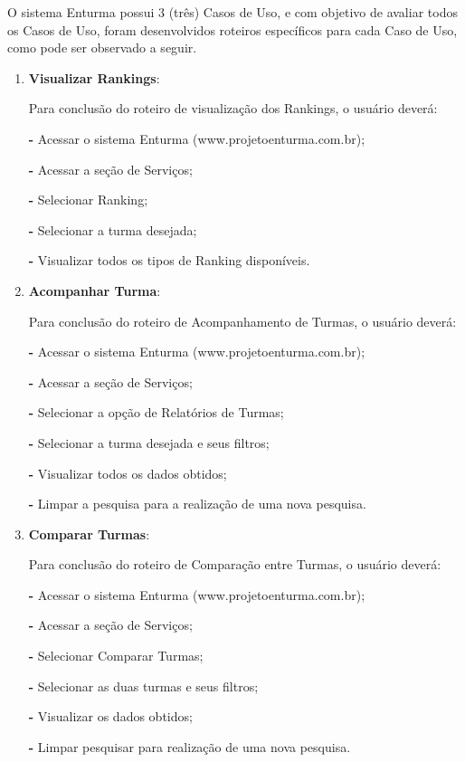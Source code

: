 	O sistema Enturma possui 3 (três) Casos de Uso, e com objetivo de avaliar todos os Casos de Uso, foram desenvolvidos roteiros específicos para cada Caso de Uso, como pode ser observado a seguir.


	\begin{enumerate}
		\item \textbf{Visualizar Rankings}:

			Para conclusão do roteiro de visualização dos Rankings, o usuário deverá:

				\textbf{-} Acessar o sistema Enturma (www.projetoenturma.com.br);
				
				\textbf{-} Acessar a seção de Serviços;
				
				\textbf{-} Selecionar Ranking;
				
				\textbf{-} Selecionar a turma desejada;
				
				\textbf{-} Visualizar todos os tipos de Ranking disponíveis.

		\item \textbf{Acompanhar Turma}:
			
			Para conclusão do roteiro de Acompanhamento de Turmas, o usuário deverá:
				
				\textbf{-} Acessar o sistema Enturma (www.projetoenturma.com.br);
				
				\textbf{-} Acessar a seção de Serviços;
				
				\textbf{-} Selecionar a opção de Relatórios de Turmas;
				
				\textbf{-} Selecionar a turma desejada e seus filtros;
				
				\textbf{-} Visualizar todos os dados obtidos;
				
				\textbf{-} Limpar a pesquisa para a realização de uma nova pesquisa.

		\item \textbf{Comparar Turmas}:

			Para conclusão do roteiro de Comparação entre Turmas, o usuário deverá:
				
				\textbf{-} Acessar o sistema Enturma (www.projetoenturma.com.br);
				
				\textbf{-} Acessar a seção de Serviços;
				
				\textbf{-} Selecionar Comparar Turmas;
				
				\textbf{-} Selecionar as duas turmas e seus filtros;
				
				\textbf{-} Visualizar os dados obtidos;
				
				\textbf{-} Limpar pesquisar para realização de uma nova pesquisa.

	\end{enumerate}
